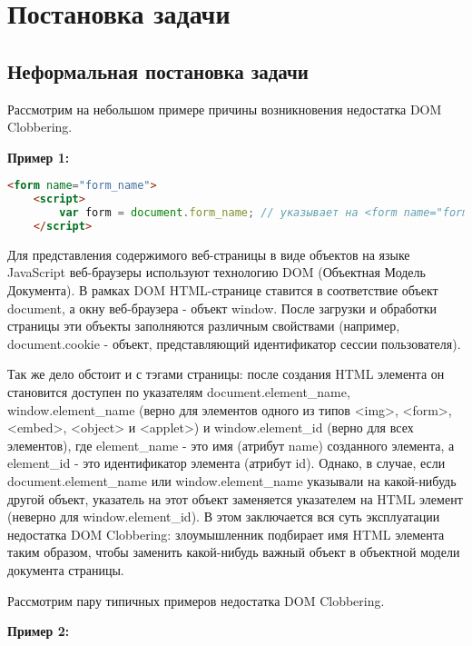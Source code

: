 
\chapter{Постановка задачи}\label{Introduction}

\section{Неформальная постановка задачи}

Рассмотрим на небольшом примере причины возникновения недостатка DOM Clobbering.

\bigskip
\textbf{Пример 1:}

\begin{lstlisting}[language=HTML]
	<form name="form_name">
	<script>
		var form = document.form_name; // указывает на <form name="form_name">
	</script>
\end{lstlisting}
\bigskip




Для представления содержимого веб-страницы в виде объектов на языке JavaScript веб-браузеры используют технологию DOM (Объектная Модель Документа). В рамках DOM HTML-странице ставится в соответствие объект document, а окну веб-браузера - объект window. После загрузки и обработки страницы эти объекты заполняются различным свойствами (например, document.cookie - объект, представляющий идентификатор сессии пользователя).


Так же дело обстоит и с тэгами страницы: после создания HTML элемента он становится доступен по указателям document.element\_name, window.element\_name (верно для элементов одного из типов <img>, <form>, <embed>, <object> и <applet>) и window.element\_id (верно для всех элементов), где element\_name - это имя (атрибут name) созданного элемента, а element\_id - это идентификатор элемента (атрибут id). Однако, в случае, если document.element\_name или window.element\_name указывали на какой-нибудь другой объект, указатель на этот объект заменяется указателем на HTML элемент (неверно для window.element\_id). В этом заключается вся суть эксплуатации недостатка DOM Clobbering: злоумышленник подбирает имя HTML элемента таким образом, чтобы заменить какой-нибудь важный объект в объектной модели документа страницы.

Рассмотрим пару типичных примеров недостатка DOM Clobbering.

\bigskip
\textbf{Пример 2:}


